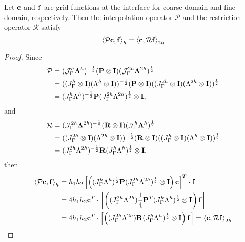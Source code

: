 {\color{red}
\begin{lemma}\label{lemma1}
 Let ${\bf c}$ and ${\bf f}$ are grid functions at the interface for coarse domain and fine domain, respectively. Then the interpolation operator $\mathcal{P}$ and the restriction operator $\mathcal{R}$ satisfy
 \begin{equation}\label{pr_relation}
 \left<\mathcal{P} {\bf c}, {\bf f}\right>_h = \left<{\bf c}, \mathcal{R}{\bf f}\right>_{2h}
 \end{equation}
\end{lemma}
\begin{proof}
	Since 
	\begin{align*}
	{\mathcal{P}} &= (\mathcal{J}^h_\Gamma \bm{\Lambda}^h)^{-\frac{1}{2}}({\bf P}\otimes{\bf I})(\mathcal{J}^{2h}_\Gamma \bm{\Lambda}^{2h})^{\frac{1}{2}}\\
	& = ((J_{\Gamma}^h\otimes{\bf I})(\Lambda^h\otimes{\bf I}))^{-\frac{1}{2}}({\bf P}\otimes{\bf I})((J_{\Gamma}^{2h}\otimes{\bf I})(\Lambda^{2h}\otimes{\bf I}))^{\frac{1}{2}}\\
	& = (J_{\Gamma}^h\Lambda^h)^{-\frac{1}{2}}{\bf P}(J_{\Gamma}^{2h}\Lambda^{2h})^{\frac{1}{2}}\otimes{\bf I},
	\end{align*}
	and
	\begin{align*}
	{\mathcal{R}} &= (\mathcal{J}^{2h}_\Gamma \bm{\Lambda}^{2h})^{-\frac{1}{2}}({\bf R}\otimes{\bf I})(\mathcal{J}^{h}_\Gamma \bm{\Lambda}^{h})^{\frac{1}{2}}\\
	& = ((J_{\Gamma}^{2h}\otimes{\bf I})(\Lambda^{2h}\otimes{\bf I}))^{-\frac{1}{2}}({\bf R}\otimes{\bf I})((J_{\Gamma}^{h}\otimes{\bf I})(\Lambda^{h}\otimes{\bf I}))^{\frac{1}{2}}\\
	& = (J_{\Gamma}^{2h}\Lambda^{2h})^{-\frac{1}{2}}{\bf R}(J_{\Gamma}^{h}\Lambda^{h})^{\frac{1}{2}}\otimes{\bf I},
	\end{align*}
	then
	\begin{align*}
	\left<\mathcal{P}{\bf c}, {\bf f}\right>_h &= h_1h_2\left[\left((J_{\Gamma}^h\Lambda^h)^{\frac{1}{2}} {\bf P}(J_{\Gamma}^{2h}\Lambda^{2h})^{\frac{1}{2}}\otimes {\bf I}\right){\bf c}\right]^T\cdot{\bf f}\\
	& = 4h_1h_2 {\bf c}^T \cdot \left[\left((J_{\Gamma}^{2h}\Lambda^{2h})\frac{1}{4}{\bf P}^T(J_{\Gamma}^h\Lambda^h)^{\frac{1}{2}}\otimes {\bf I}\right) {\bf f}\right]\\
	& =4h_1h_2 {\bf c}^T \cdot \left[\left((J_{\Gamma}^{2h}\Lambda^{2h}){\bf R}(J_{\Gamma}^h\Lambda^h)^{\frac{1}{2}}\otimes {\bf I}\right) {\bf f}\right] = \left<{\bf c}, \mathcal{R}{\bf f}\right>_{2h}
	\end{align*}
\end{proof}
}

